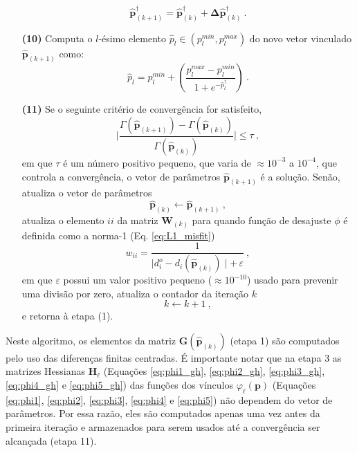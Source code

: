 \begin{itemize}
	$$
	\hat{\mathbf{p}}^{\dagger}_{(k+1)} = \hat{\mathbf{p}}^{\dagger}_{(k)} + \boldsymbol{\Delta}\hat{\mathbf{p}}^{\dagger}_{(k)} \: .
	$$
	\item[\textbf{(10)}] Computa o $l$-ésimo elemento $ \hat{p}_{l}\in (p^{min}_l, p^{max}_l) $ do novo vetor vinculado
	$\hat{\mathbf{p}}_{(k+1)}$ como:
	$$
	\hat{p}_{l} = p_{l}^{min} + \left(\frac{p_{l}^{max} - p_{l}^{min}}{ 1 + e^{-\hat{p}^{\dagger}_{l}} }\right) \: .
	$$
	\item[\textbf{(11)}] Se o seguinte critério de convergência for satisfeito,
	$$
	\Bigg|
	\frac{\Gamma(\hat{\mathbf{p}}_{(k+1)}) - \Gamma(\hat{\mathbf{p}}_{(k)})}
	{\Gamma(\hat{\mathbf{p}}_{(k)})} 
	\Bigg| \le \tau \: ,
	$$ 
	em que $\tau$ é um número positivo pequeno, que varia de $\approx 10^{-3}$ a 
	$10^{-4}$, que controla a convergência, o vetor de parâmetros $\hat{\mathbf{p}}_{(k+1)}$ é a solução. 
	Senão, atualiza o vetor de parâmetros 
	$$
	\hat{\mathbf{p}}_{(k)} \leftarrow \hat{\mathbf{p}}_{(k+1)} \: ,
	$$
	atualiza o elemento $ii$ da matriz $\mathbf{W}_{(k)}$ para quando função de desajuste $ \phi $ é definida como a norma-1 (Eq. \ref{eq:L1_misfit})
	$$
	w_{ii} = \frac{1}{\mid d_{i}^{o} -d_{i}(\hat{\mathbf{p}}_{(k)}) \mid + 
		\, \varepsilon} \: ,
	$$
	em que $\varepsilon$ possui um valor positivo pequeno ($\approx 10^{-10}$) usado
	para prevenir uma divisão por zero, atualiza o contador da iteração $k$
	$$
	k \leftarrow k + 1 \: ,
	$$
	e retorna à etapa (1).
\end{itemize}

Neste algoritmo, os elementos da matriz $\mathbf{G}(\hat{\mathbf{p}}_{(k)})$ 
(etapa 1) são computados pelo uso das diferenças finitas centradas.
É importante notar que na etapa 3 as matrizes Hessianas $\mathbf{H}_{\ell}$ (Equações \ref{eq:phi1_gh}, \ref{eq:phi2_gh}, \ref{eq:phi3_gh}, \ref{eq:phi4_gh} e \ref{eq:phi5_gh})
das funções dos vínculos $\varphi_{\ell}(\mathbf{p})$ 
(Equações \ref{eq:phi1}, \ref{eq:phi2}, \ref{eq:phi3}, \ref{eq:phi4} e \ref{eq:phi5}) 
não dependem do vetor de parâmetros. Por essa razão, eles são computados apenas uma vez antes da primeira iteração e armazenados para serem usados até a convergência ser alcançada (etapa 11).

